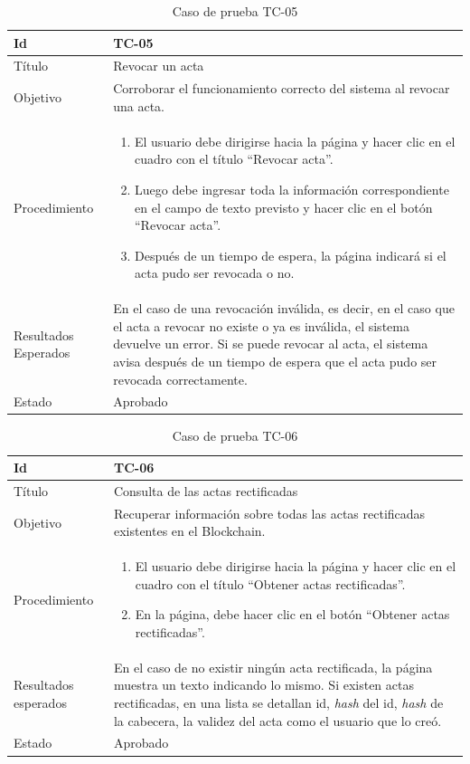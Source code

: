\begin{table}[H]
\begin{tabularx}{\textwidth}{|m{3cm}|X|}
\hline
Id & TC-05\\
\hline
Título & Revocar un acta \\
\hline
Objetivo & Corroborar el funcionamiento correcto del sistema al revocar una acta.\\
\hline
Procedimiento & \begin{enumerate}
    \item El usuario debe dirigirse hacia la página y hacer clic en el cuadro con el título ``Revocar acta''.
    \item Luego debe ingresar toda la información correspondiente en el campo de texto previsto y hacer clic en el botón ``Revocar acta''.
    \item Después de un tiempo de espera, la página indicará si el acta pudo ser revocada o no.
\end{enumerate}\\
\hline
Resultados Esperados & En el caso de una revocación inválida, es decir, en el caso que el acta a revocar no existe o ya es inválida, el sistema devuelve un error. Si se puede revocar al acta, el sistema avisa después de un tiempo de espera que el acta pudo ser revocada correctamente.\\
\hline
Estado & Aprobado\\
\hline
\end{tabularx}
\caption{Caso de prueba TC-05}
\end{table}


\begin{table}[H]
\begin{tabularx}{\textwidth}{|m{3cm}|X|}
\hline
Id & TC-06\\
\hline
Título & Consulta de las actas rectificadas\\
\hline
Objetivo & Recuperar información sobre todas las actas rectificadas existentes en el Blockchain.\\
\hline
Procedimiento & \begin{enumerate}
\item El usuario debe dirigirse hacia la página y hacer clic en el cuadro con el título ``Obtener actas rectificadas''.
\item En la página, debe hacer clic en el botón ``Obtener actas rectificadas''.
\end{enumerate}\\
\hline
Resultados esperados & En el caso de no existir ningún acta rectificada, la página muestra un texto indicando lo mismo. Si existen actas rectificadas, en una lista se detallan id, \textit{hash} del id, \textit{hash} de la cabecera, la validez del acta como el usuario que lo creó. \\
\hline
Estado & Aprobado\\
\hline
\end{tabularx}
\caption{Caso de prueba TC-06}
\end{table}


